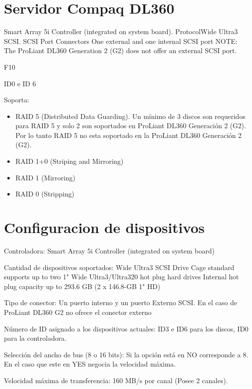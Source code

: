 \documentclass[a4paper]{article}
\begin{document}
\section{Servidor Compaq DL360}
\begin{enumerateabc}
\item Smart Array 5i Controller (integrated on system board).
ProtocolWide Ultra3 SCSI. SCSI Port Connectors One external and one internal SCSI port
NOTE: The ProLiant DL360 Generation 2 (G2) does not offer an external SCSI port.
\item F10
\item ID0 e ID 6
\item Soporta: \begin{itemize}
\item RAID 5 (Distributed Data Guarding). Un mínimo de 3 discos son requeridos para RAID 5 y solo 2 son soportados en ProLiant DL360 Generación 2 (G2). Por lo tanto RAID 5 no esta soportado en la ProLiant DL360 Generación 2 (G2).
\item RAID 1+0 (Striping and Mirroring)
\item RAID 1 (Mirroring)
\item RAID 0 (Stripping)
\end{itemize}
\end{enumerateabc}
%
\section{Configuracion de dispositivos}
\begin{enumerateabc}
\item Controladora: Smart Array 5i Controller (integrated on system board)
\item Cantidad de dispositivos soportados: Wide Ultra3 SCSI Drive Cage standard supports up to two 1" Wide Ultra3/Ultra320 hot plug hard drives
Internal hot plug capacity up to 293.6 GB (2 x 146.8-GB 1" HD)
\item Tipo de conector: Un puerto interno y un puerto Externo SCSI. En el caso de ProLiant DL360 G2 no ofrece el conector externo
\item Número de ID asignado a los dispositivos actuales: ID3 e ID6 para los discos, ID0 para la controladora.
\item Selección del ancho de bus (8 o 16 bits): Si la opción está en NO corresponde a 8. En el caso que este en YES negocia la velocidad máxima.
\item Velocidad máxima de transferencia: 160 MB/s por canal (Posee 2 canales).
\end{enumerateabc}
%
\end{document}
